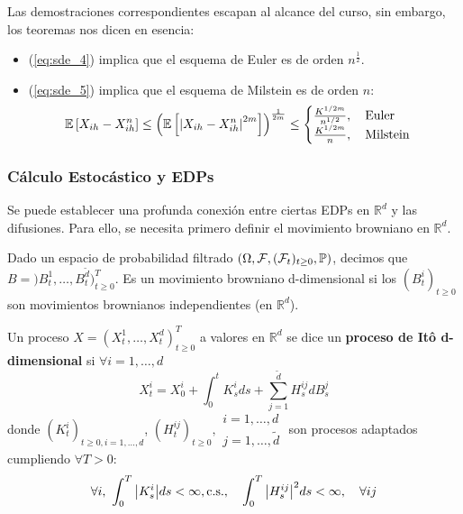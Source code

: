Las demostraciones correspondientes escapan al alcance del curso, sin embargo, los teoremas nos
dicen en esencia: 
\begin{itemize}
        \item (\ref{eq:sde_4}) implica que el esquema de Euler es de orden $n^{\frac{1}{2}}$. 
        \item (\ref{eq:sde_5}) implica que el esquema de Milstein es de orden $n$: 
                \begin{equation*}
                        \E \left[ X_{ih} - X_{ih}^{n} \right] \le  \left( \E
                        \left[ \abs{X_{ih} - X_{ih}^{n}}^{2m} \right]
                        \right)^{\frac{1}{2m}} \le  
                        \begin{cases}
                                \frac{K^{1/2m}}{n^{1/2}}, ~ ~ ~ \text{Euler} \\
                                \frac{K^{1/2m}}{n}, ~ ~ ~ \text{Milstein}
                        \end{cases}
                \end{equation*}
\end{itemize}

\subsubsection{Cálculo Estocástico y EDPs}

Se puede establecer una profunda conexión entre ciertas EDPs en $\mathbb{R}^{d}$ y las difusiones. Para ello, 
se necesita primero definir el movimiento browniano en $\mathbb{R}^d$. 
\begin{definition}
        Dado un espacio de probabilidad filtrado $(\Omega, \mathcal{F},(\mathcal{F}_t)_{t \geq 0}, \P)$, 
        decimos que $B = )B_t^1, \ldots, B_t^{\tilde{d}})_{t \ge 0}^{T}$. Es un movimiento browniano 
        d-dimensional si los $(B_t^i)_{t\ge 0}$ son movimientos brownianos independientes 
        (en $\mathbb{R}^d$). 
\end{definition}

\begin{definition}
        Un proceso $X = (X_t^1, \ldots, X_t^d)_{t \ge 0}^T$ a valores en $\mathbb{R}^d$ se dice un 
        \textbf{proceso de It\^{o} d-dimensional} si $\forall i = 1, \ldots, d$ 
        \begin{equation*}
                \label{eq:sde_6}
                \tag{*}
                X_t^i = X_0^i + \int_{0}^{t} K_s^i ds + \sum_{j=1}^{\tilde{d}} H_s^{ij} dB_s^j
        \end{equation*}
        donde $(K_{t}^{i})_{t \ge 0, i=1,\ldots,d}$, $(H^{ij}_{t})_{t \ge  0},
        \substack{i =1, \ldots,d \\ j =1, \ldots,\tilde{d}}$ son procesos adaptados cumpliendo $\forall T > 0$: 
        \begin{equation*}
                \forall i, ~ \int_{0}^{T} \abs{K_s^i} ds < \infty, \text{c.s.}, ~ ~ ~ 
                \int_{0}^{T} \abs{H^{ij}_s}^2 ds < \infty, ~ ~ ~ \forall ij
        \end{equation*}
\end{definition}

